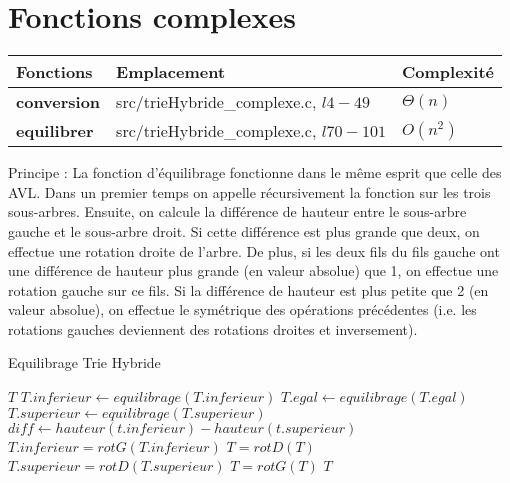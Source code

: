 \documentclass[11pt]{report} %
\begin{document}
\section{Fonctions complexes}

\begin{center}
  \begin{tabular}{|l|l|l|}
    \hline  \textbf{Fonctions} & \textbf{Emplacement} & \textbf{Complexité}\\  \hline
    \textbf{conversion} & src/trieHybride\_complexe.c, $l4-49$  & $\Theta(n)$ \\ \hline
    \textbf{equilibrer} & src/trieHybride\_complexe.c, $l70-101$  & $O(n^2)$ \\ \hline
  \end{tabular}
\end{center}

Principe : La fonction d'équilibrage fonctionne dans le même esprit que celle des AVL. Dans un premier temps on appelle récursivement la fonction sur les trois sous-arbres. Ensuite, on calcule la différence de hauteur entre le sous-arbre gauche et le sous-arbre droit. Si cette différence est plus grande que deux, on effectue une rotation droite de l'arbre. De plus, si les deux fils du fils gauche ont une différence de hauteur plus grande (en valeur absolue) que 1, on effectue une rotation gauche sur ce fils. Si la différence de hauteur est plus petite que 2 (en valeur absolue), on effectue le symétrique des opérations précédentes (i.e. les rotations gauches deviennent des rotations droites et inversement).
\begin{algorithm}
  \caption{Equilibrage Trie Hybride}
  \begin{algorithmic}[1]
     $T$
    \EndIf
    \State $T.inferieur \gets equilibrage(T.inferieur)$
    \State $T.egal \gets equilibrage(T.egal)$
    \State $T.superieur \gets equilibrage(T.superieur)$
    \State $diff \gets hauteur(t.inferieur)-hauteur(t.superieur)$
    \State $T.inferieur=rotG(T.inferieur)$
    \EndIf  
    \State $T=rotD(T)$
    \State $T.superieur=rotD(T.superieur)$
    \EndIf  
    \State $T=rotG(T)$
    \EndIf
     $T$
    \EndFunction
  \end{algorithmic}
\end{algorithm}
\end{document}
